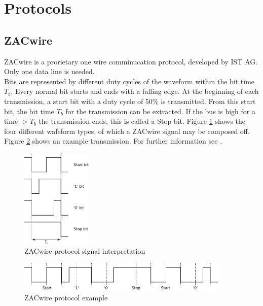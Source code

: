\documentclass[a4paper]{scrreprt}
\begin{document}
\section{Protocols}
\subsection{ZACwire}\label{chap:zac}
ZACwire is a prorietary one wire comminucation protocol, developed
by IST AG. Only one data line is needed.\\
Bits are represented by
different duty cycles of the waveform within the bit time $T_b$.
Every normal bit starts and ends with a falling edge. At the beginning
of each transmission, a start bit with a duty cycle of 50\% is
transmitted. From this start bit, the bit time $T_b$ for the
transmission can be extracted. If the bus is high for a time $>T_b$
the transmission ends, this is called a Stop bit. Figure \ref{fig:zac}
shows the four different wafeform types, of which a ZACwire signal may be
composed off. Figure \ref{fig:zacexample} shows an example
transmission. For further information see \cite{zac}.
\begin{figure}[b]
	\centering
	\includegraphics[width=0.3\textwidth]{img/zac_bits.pdf}
	\caption{ZACwire protocol signal interpretation}
	\label{fig:zac}
\end{figure}
\begin{figure}[b]
	\centering
	\includegraphics[width=0.9\textwidth]{img/zac_example.pdf}
	\caption{ZACwire protocol example}
	\label{fig:zacexample}
\end{figure}
\end{document}
